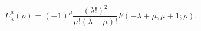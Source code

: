 \begin{equation}
L_{\lambda }^{\mu }\left( \rho \right) =\left( -1\right) ^{\mu }\frac{\left(
\lambda !\right) ^{2}}{\mu !\left( \lambda -\mu \right) !}F\left( -\lambda
+\mu ,\mu +1;\rho \right) .
\end{equation}

